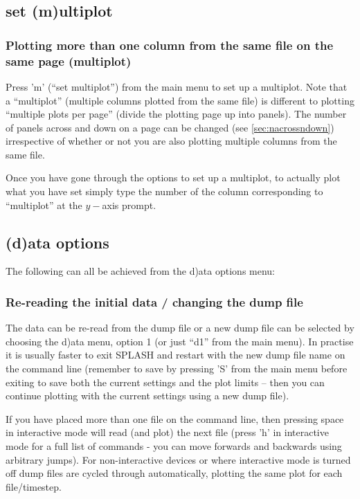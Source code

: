 \documentclass[a4paper,10pt]{article}
\newcommand{\splash}{\textsc{SPLASH }}
\begin{document}
\subsection{set (m)ultiplot}
\label{sec:multiplot}
\subsubsection{ Plotting more than one column from the same file on the same page (multiplot)}
 Press 'm'  (``set multiplot'') from the main menu to set up a multiplot. Note that a ``multiplot'' (multiple columns plotted from the same file) is different to plotting ``multiple plots per page'' (divide the plotting page up into panels). The number of panels across and down on a page can be changed (see \ref{sec:nacrossndown}) irrespective of whether or not you are also plotting multiple columns from the same file.

Once you have gone through the options to set up a multiplot, to actually plot what you have set simply type the number of the column corresponding to ``multiplot'' at the $y-$axis prompt.

\subsection{(d)ata options}
The following can all be achieved from the d)ata options menu:

\subsubsection{ Re-reading the initial data / changing the dump file}
\label{sec:d1}
 The data can be re-read from the dump file or a new dump file can be selected by choosing  the d)ata menu, option 1 (or just ``d1'' from the main menu). In practise it is usually faster to exit \splash and restart with the new dump file name on the command line (remember to save by pressing 'S' from the main menu before exiting to save both the current settings and the plot limits -- then you can continue plotting with the current settings using a new dump file).
 
 If you have placed more than one file on the command line, then pressing space in interactive mode will read (and plot) the next file (press 'h' in interactive mode for a full list of commands - you can move forwards and backwards using arbitrary jumps). For non-interactive devices or where interactive mode is turned off dump files are cycled through automatically, plotting the same plot for each file/timestep.
 
\end{document}
